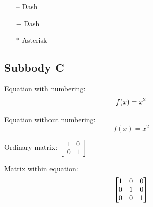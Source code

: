         \begin{itemize}
            \item[--] Dash
            \item[$-$] Dash
            \item[$\ast$] Asterisk
        \end{itemize}

        \newpage

    \subsection{Subbody C}
    
        \vspace{0.3cm}
        \noindent
        Equation with numbering:
        \begin{equation}
            f(x) = x^2
            \label{equation:eq_two}
            \indexequation{Equation with numering}
        \end{equation}

        \vspace{0.3cm}
        \noindent
        Equation without numbering:
        \begin{equation*}
            f(x) = x^2
        \end{equation*}

        \vspace{0.cm}
        \noindent
        Ordinary matrix:
        $\left[
        \begin{matrix}
            1 & 0 \\
            0 & 1 
        \end{matrix}
        \right]$
        
        \vspace{0.5cm}
        \noindent
        Matrix within equation:
        \begin{equation}
            \left[
            \begin{matrix}
                1 & 0 & 0 \\
                0 & 1 & 0 \\
                0 & 0 & 1 \\
            \end{matrix}
            \right]
            \label{equation:mtx_one}
            \indexequation{Matrix numered as equations}
        \end{equation}
        
